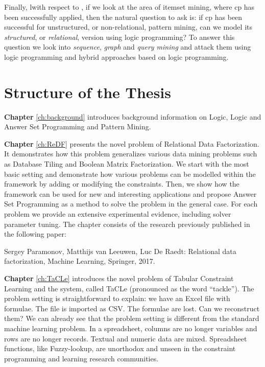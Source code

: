 Finally, lwith respect to \cfour, if we look at the area of itemset mining, where \acrlong{cp}
has been successfully applied, then the natural question to ask is:
if \acrshort{cp} has been successful for unstructured, or
non-relational, pattern mining, can we model its \textit{structured},
or \textit{relational}, version using logic programming? To answer
this question we look into \textit{sequence}, \textit{graph} and
\textit{query mining} and attack them using logic programming and
hybrid approaches based on logic programming.


\section{Structure of the Thesis}
\textbf{Chapter} \ref{ch:background} introduces background information on Logic, Logic and Answer Set Programming and Pattern Mining.

\textbf{Chapter} \ref{ch:ReDF} presents the novel problem of Relational Data
Factorization. It demonstrates how this problem generalizes various
data mining problems such as Database Tiling and Boolean Matrix
Factorization. We start with the most basic setting and demonstrate
how various problems can be modelled within the framework by adding
or modifying the constraints. Then, we show how the framework can be
used for new and interesting applications and propose Answer Set
Programming as a method to solve the problem in the general case.
For each problem we provide an extensive experimental evidence,
including solver parameter tuning. The chapter consists of the
research previously published in the following paper:

\begin{addmargin}[2em]{2em}

Sergey Paramonov,  Matthijs van Leeuwen, Luc De Raedt: Relational data
factorization, Machine Learning, Springer, 2017.

\end{addmargin}



\textbf{Chapter} \ref{ch:TaCLe} introduces  the novel problem of
Tabular Constraint Learning and the system, called TaCLe (pronounced
as the word ``tackle''). The problem setting is straightforward to
explain: we have an Excel file with formulae. The file is imported as
CSV. The formulae are lost. Can we reconstruct them? We can already 
see that the problem setting is different from the standard machine
learning problem. In a spreadsheet, columns are no longer variables
and rows are no longer records. Textual and numeric data are mixed.
Spreadsheet functions, like Fuzzy-lookup, are unorthodox and unseen in
the constraint programming and learning research communities.

